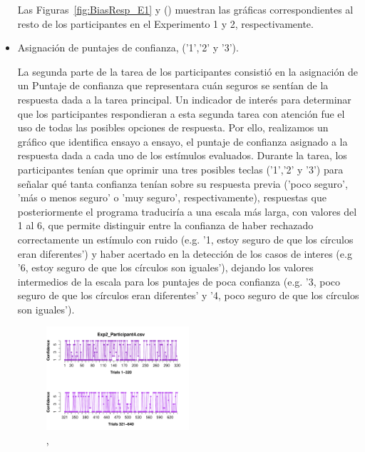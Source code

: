 \begin{itemize}
Las Figuras~\ref{fig:BiasResp_E1} y () muestran las gráficas correspondientes al resto de los participantes en el Experimento 1 y 2, respectivamente.\\

\item Asignación de puntajes de confianza, ('1','2' y '3').

La segunda parte de la tarea de los participantes consistió en la asignación de un Puntaje de confianza que representara cuán seguros se sentían de la respuesta dada a la tarea principal. Un indicador de interés para determinar que los participantes respondieran a esta segunda tarea con atención fue el uso de todas las posibles opciones de respuesta. Por ello, realizamos un gráfico que identifica ensayo a ensayo, el puntaje de confianza asignado a la respuesta dada a cada uno de los estímulos evaluados. Durante la tarea, los participantes tenían que oprimir una tres posibles teclas ('1','2' y '3') para señalar qué tanta confianza tenían sobre su respuesta previa ('poco seguro', 'más o menos seguro' o 'muy seguro', respectivamente), respuestas que posteriormente el programa traduciría a una escala más larga, con valores del 1 al 6, que permite distinguir entre la confianza de haber rechazado correctamente un estímulo con ruido (e.g. '1, estoy seguro de que los círculos eran diferentes') y haber acertado en la detección de los casos de interes (e.g '6, estoy seguro de que los círculos son iguales'), dejando los valores intermedios de la escala para los puntajes de poca confianza (e.g. '3, poco seguro de que los círculos eran diferentes' y '4, poco seguro de que los círculos son iguales').\\


\begin{figure}[th]
\centering
\includegraphics[width=0.50\textwidth]{Figures/Rating_Exp2_P4} 
\caption[Asignacion Puntaje de confianza: Participante con multiples elecciones]{,}
\label{fig:Rating_E2_P4}
\end{figure}


\end{itemize}
